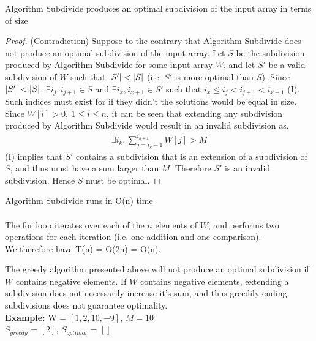 \documentclass[12pt]{article}
\newenvironment{lemma}[2][Lemma]{\begin{trivlist}
\item[\hskip \labelsep {\bfseries #1}\hskip \labelsep {\bfseries #2.}]}{\end{trivlist}}
\newenvironment{question}[2][Question]{\begin{trivlist}
\item[\hskip \labelsep {\bfseries #1}\hskip \labelsep {\bfseries #2.}]}{\end{trivlist}}
\DeclarePairedDelimiter\abs{\lvert}{\rvert}%
\begin{document}
\begin{question}{1 (a)}
  \pagebreak
  \begin{lemma}{1.2} Algorithm Subdivide produces an optimal subdivision of the
                     input array in terms of size
    \begin{proof} (Contradiction)
      Suppose to the contrary that Algorithm Subdivide does not produce an optimal
      subdivision of the input array. Let $S$ be the subdivision produced by
      Algorithm Subdivide for some input array $W$, and let $S'$ be a valid
      subdivision of $W$ such that $\abs{S'} < \abs{S}$ (i.e. $S'$ is more
      optimal than $S$).  Since $\abs{S'} < \abs{S}$, $\exists i_{j}, i_{j+1} \in S$
      and $\exists i_{x}, i_{x+1} \in S'$ such that $i_{x} \leq i_{j} < i_{j+1} < i_{x+1}$ (I).
      Such indices must exist for if they didn't the solutions would be equal in size.
      Since $W[i] > 0,\ 1 \leq i \leq n$, it can be seen that extending any subdivision
      produced by Algorithm Subdivide would result in an invalid subdivision as,
      \begin{align*}
        \exists i_{k}, \sum_{j=i_{k}+1}^{i_{k+1}} W[j] > M
      \end{align*}
      (I) implies that $S'$ contains a subdivision that is an extension of
      a subdivision of $S$, and thus must have a sum larger than $M$.  Therefore $S'$
      is an invalid subdivision.  Hence $S$ must be optimal.
    \end{proof}
  \end{lemma}

  \begin{lemma}{1.3} Algorithm Subdivide runs in O(n) time
    \leavevmode \\ \\
    The for loop iterates over each of the $n$ elements of $W$, and performs
    two operations for each iteration (i.e. one addition and one comparison). \\
    We therefore have T(n) = O(2n) = O(n).
  \end{lemma}
\end{question}

\begin{question}{1 (b)}
  The greedy algorithm presented above will not produce an optimal subdivision
  if $W$ contains negative elements.  If $W$ contains negative elements, extending
  a subdivision does not necessarily increase it's sum, and thus greedily ending
  subdivisions does not guarantee optimality. \\

  \textbf{Example:}
  W = $[1, 2, 10, -9]$, $M = 10$ \\
  $S_{greedy}$ = $[2]$, $S_{optimal}$ = $[]$ \\
\end{question}
\end{document}
